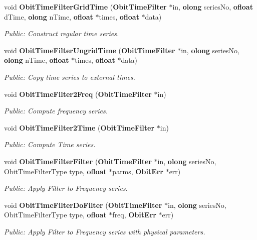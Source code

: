 \begin{CompactItemize}
void {\bf Obit\-Time\-Filter\-Grid\-Time} ({\bf Obit\-Time\-Filter} $\ast$in, {\bf olong} series\-No, {\bf ofloat} d\-Time, {\bf olong} n\-Time, {\bf ofloat} $\ast$times, {\bf ofloat} $\ast$data)
\begin{CompactList}\small\item\em Public: Construct regular time series. \item\end{CompactList}\item 
void {\bf Obit\-Time\-Filter\-Ungrid\-Time} ({\bf Obit\-Time\-Filter} $\ast$in, {\bf olong} series\-No, {\bf olong} n\-Time, {\bf ofloat} $\ast$times, {\bf ofloat} $\ast$data)
\begin{CompactList}\small\item\em Public: Copy time series to external times. \item\end{CompactList}\item 
void {\bf Obit\-Time\-Filter2Freq} ({\bf Obit\-Time\-Filter} $\ast$in)
\begin{CompactList}\small\item\em Public: Compute frequency series. \item\end{CompactList}\item 
void {\bf Obit\-Time\-Filter2Time} ({\bf Obit\-Time\-Filter} $\ast$in)
\begin{CompactList}\small\item\em Public: Compute Time series. \item\end{CompactList}\item 
void {\bf Obit\-Time\-Filter\-Filter} ({\bf Obit\-Time\-Filter} $\ast$in, {\bf olong} series\-No, Obit\-Time\-Filter\-Type type, {\bf ofloat} $\ast$parms, {\bf Obit\-Err} $\ast$err)
\begin{CompactList}\small\item\em Public: Apply Filter to Frequency series. \item\end{CompactList}\item 
void {\bf Obit\-Time\-Filter\-Do\-Filter} ({\bf Obit\-Time\-Filter} $\ast$in, {\bf olong} series\-No, Obit\-Time\-Filter\-Type type, {\bf ofloat} $\ast$freq, {\bf Obit\-Err} $\ast$err)
\begin{CompactList}\small\item\em Public: Apply Filter to Frequency series with physical parameters. \item\end{CompactList}\item 

\end{CompactItemize}
